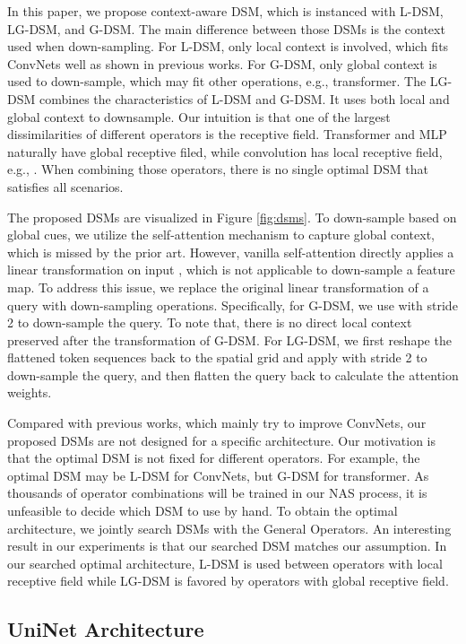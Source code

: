 \documentclass{article} \usepackage{iclr2022_conference,times}
\begin{document}
In this paper, we propose context-aware DSM, which is instanced with L-DSM, LG-DSM, and G-DSM. The main difference between those DSMs is the context used when down-sampling. For L-DSM, only local context is involved, which fits ConvNets well as shown in previous works. For G-DSM, only global context is used to down-sample, which may fit other operations, e.g., transformer. The LG-DSM combines the characteristics of L-DSM and G-DSM. It uses both local and global context to downsample. Our intuition is that one of the largest dissimilarities of different operators is the receptive field. Transformer and MLP naturally have global receptive filed, while convolution has local receptive field, e.g., . When combining those operators, there is no single optimal DSM that satisfies all scenarios.

The proposed DSMs are visualized in Figure \ref{fig:dsms}. To down-sample based on global cues, we utilize the self-attention mechanism to capture global context, which is missed by the prior art. However, vanilla self-attention directly applies a linear transformation on input , which is not applicable to down-sample a feature map. To address this issue, we replace the original linear transformation of a query with down-sampling operations. Specifically, for G-DSM, we use  with stride 2 to down-sample the query. To note that, there is no direct local context preserved after the transformation of G-DSM. For LG-DSM, we first reshape the flattened token sequences back to the spatial grid and apply  with stride 2 to down-sample the query, and then flatten the query back to calculate the attention weights.

Compared with previous works, which mainly try to improve ConvNets, our proposed DSMs are not designed for a specific architecture. Our motivation is that the optimal DSM is not fixed for different operators. For example, the optimal DSM may be L-DSM for ConvNets, but G-DSM for transformer. As thousands of operator combinations will be trained in our NAS process, it is unfeasible to decide which DSM to use by hand. To obtain the optimal architecture, we jointly search DSMs with the General Operators. An interesting result in our experiments is that our searched DSM matches our assumption. In our searched optimal architecture, L-DSM is used between operators with local receptive field while LG-DSM is favored by operators with global receptive field. 

\subsection{UniNet Architecture}
\end{document}
